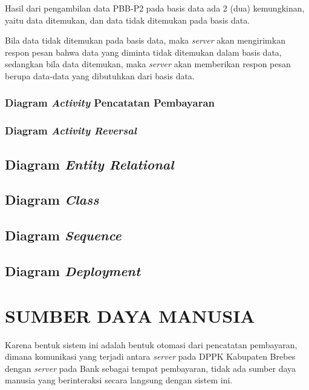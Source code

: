 \documentclass[pdftex,12pt, oneside]{article}
\begin{document}
Hasil dari pengambilan data PBB-P2 pada basis data ada 2 (dua) kemungkinan, yaitu data ditemukan, dan data tidak ditemukan pada basis data.

Bila data tidak ditemukan pada basis data, maka \textit{server} akan mengirimkan respon pesan bahwa data yang diminta tidak ditemukan dalam basis data, sedangkan bila data ditemukan, maka \textit{server} akan memberikan respon pesan berupa data-data yang dibutuhkan dari basis data.

\subsubsection{Diagram \textit{Activity} Pencatatan Pembayaran}
\subsubsection{Diagram \textit{Activity Reversal}}

\subsection{Diagram \textit{Entity Relational}}
\subsection{Diagram \textit{Class}}
\subsection{Diagram \textit{Sequence}}
\subsection{Diagram \textit{Deployment}}

\section{SUMBER DAYA MANUSIA}

Karena bentuk sistem ini adalah bentuk otomasi dari pencatatan pembayaran, dimana komunikasi yang terjadi antara \textit{server} pada DPPK Kabupaten Brebes dengan \textit{server} pada Bank sebagai tempat pembayaran, tidak ada sumber daya manusia yang berinteraksi secara langsung dengan sistem ini.
\end{document}
